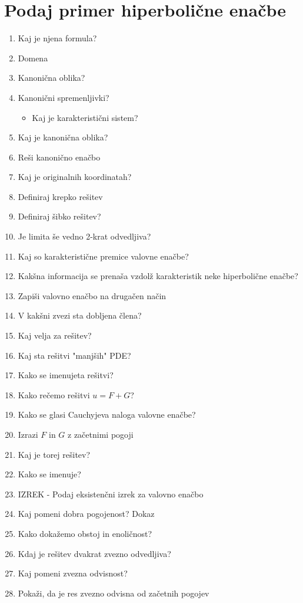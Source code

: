 \documentclass{article}
\begin{document}
    \section{Podaj primer hiperbolične enačbe}
    \begin{enumerate}
        \item Kaj je njena formula?
        \item Domena
        \item Kanonična oblika?
        \item Kanonični spremenljivki?
        \begin{itemize}
            \item Kaj je karakteristični sistem?
        \end{itemize}
        \item Kaj je kanonična oblika?   
        \item Reši kanonično enačbo
        \item Kaj je originalnih koordinatah?
        \item Definiraj krepko rešitev
        \item Definiraj šibko rešitev?
        \item Je limita še vedno 2-krat odvedljiva?
        \item Kaj so karakteristične premice valovne enačbe?
        \item Kakšna informacija se prenaša vzdolž karakteristik neke hiperbolične enačbe?
        \item Zapiši valovno enačbo na drugačen način
        \item V kakšni zvezi sta dobljena člena?
        \item Kaj velja za rešitev?
        \item Kaj sta rešitvi "manjših" PDE?
        \item Kako se imenujeta rešitvi?
        \item Kako rečemo rešitvi $u = F + G$?
        \item Kako se glasi Cauchyjeva naloga valovne enačbe?
        \item Izrazi $F$ in $G$ z začetnimi pogoji
        \item Kaj je torej rešitev?
        \item Kako se imenuje?
        \item IZREK - Podaj eksistenčni izrek za valovno enačbo
        \item Kaj pomeni dobra pogojenost?
        Dokaz
        \item Kako dokažemo obstoj in enoličnost?
        \item Kdaj je rešitev dvakrat zvezno odvedljiva?
        \item Kaj pomeni zvezna odvisnost?
        \item Pokaži, da je res zvezno odvisna od začetnih pogojev
    \end{enumerate}
\end{document}
